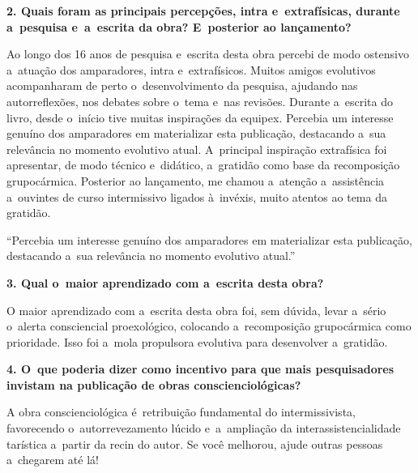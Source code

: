 \documentclass{gescons}
\begin{document}
\begin{multicols}{2}
\textbf{2. Quais foram as principais percepções, intra e~extrafísicas, durante a~pesquisa e~a~escrita da obra? E~posterior ao lançamento?}

Ao longo dos 16 anos de pesquisa e~escrita desta obra percebi de modo ostensivo a~atuação dos amparadores, intra e~extrafísicos. Muitos amigos evolutivos acompanharam de perto o~desenvolvimento da pesquisa, ajudando nas autorreflexões, nos debates sobre o~tema e~nas revisões. Durante a~escrita do livro, desde o~início tive muitas inspirações da equipex. Percebia um interesse genuíno dos amparadores em materializar esta publicação, destacando a~sua relevância no momento evolutivo atual. A~principal inspiração extrafísica foi apresentar, de modo técnico e~didático, a~gratidão como base da recomposição grupocármica. Posterior ao lançamento, me chamou a~atenção a~assistência a~ouvintes de curso intermissivo ligados à~invéxis, muito atentos ao tema da gratidão.

\begin{pullquote}
``Percebia um interesse genuíno dos amparadores em materializar esta publicação, destacando a~sua relevância no momento evolutivo atual.''
\end{pullquote}

\textbf{3. Qual o~maior aprendizado com a~escrita desta obra?}

O maior aprendizado com a~escrita desta obra foi, sem dúvida, levar a~sério o~alerta consciencial proexológico, colocando a~recomposição grupocármica como prioridade. Isso foi a~mola propulsora evolutiva para desenvolver a~gratidão. 

\textbf{4. O~que poderia dizer como incentivo para que mais pesquisadores invistam na publicação de obras conscienciológicas?}

A obra conscienciológica é~retribuição fundamental do intermissivista, favorecendo o~autorrevezamento lúcido e~a~ampliação da interassistencialidade tarística a~partir da recin do autor. Se você melhorou, ajude outras pessoas a~chegarem até lá! 
    
    
    \end{multicols}
\end{document}
